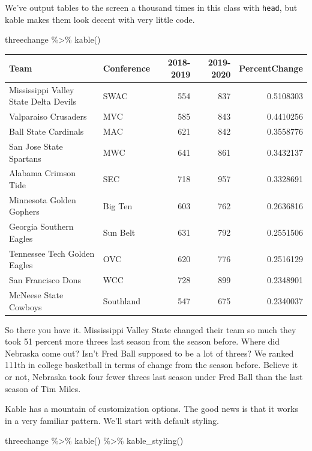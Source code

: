 \documentclass[
]{book}
\newenvironment{Shaded}{\begin{snugshade}}{\end{snugshade}}
\newcommand{\FunctionTok}[1]{\textcolor[rgb]{0.00,0.00,0.00}{#1}}
\newcommand{\NormalTok}[1]{#1}
\newcommand{\SpecialCharTok}[1]{\textcolor[rgb]{0.00,0.00,0.00}{#1}}
\begin{document}
We've output tables to the screen a thousand times in this class with \texttt{head}, but kable makes them look decent with very little code.

\begin{Shaded}
\begin{Highlighting}[]
\NormalTok{threechange }\SpecialCharTok{\%\textgreater{}\%} \FunctionTok{kable}\NormalTok{()}
\end{Highlighting}
\end{Shaded}

\begin{tabular}{l|l|r|r|r}
\hline
Team & Conference & 2018-2019 & 2019-2020 & PercentChange\\
\hline
Mississippi Valley State Delta Devils & SWAC & 554 & 837 & 0.5108303\\
\hline
Valparaiso Crusaders & MVC & 585 & 843 & 0.4410256\\
\hline
Ball State Cardinals & MAC & 621 & 842 & 0.3558776\\
\hline
San Jose State Spartans & MWC & 641 & 861 & 0.3432137\\
\hline
Alabama Crimson Tide & SEC & 718 & 957 & 0.3328691\\
\hline
Minnesota Golden Gophers & Big Ten & 603 & 762 & 0.2636816\\
\hline
Georgia Southern Eagles & Sun Belt & 631 & 792 & 0.2551506\\
\hline
Tennessee Tech Golden Eagles & OVC & 620 & 776 & 0.2516129\\
\hline
San Francisco Dons & WCC & 728 & 899 & 0.2348901\\
\hline
McNeese State Cowboys & Southland & 547 & 675 & 0.2340037\\
\hline
\end{tabular}

So there you have it. Mississippi Valley State changed their team so much they took 51 percent more threes last season from the season before. Where did Nebraska come out? Isn't Fred Ball supposed to be a lot of threes? We ranked 111th in college basketball in terms of change from the season before. Believe it or not, Nebraska took four fewer threes last season under Fred Ball than the last season of Tim Miles.

Kable has a mountain of customization options. The good news is that it works in a very familiar pattern. We'll start with default styling.

\begin{Shaded}
\begin{Highlighting}[]
\NormalTok{threechange }\SpecialCharTok{\%\textgreater{}\%} 
  \FunctionTok{kable}\NormalTok{() }\SpecialCharTok{\%\textgreater{}\%} 
  \FunctionTok{kable\_styling}\NormalTok{()}
\end{Highlighting}
\end{Shaded}
\end{document}
